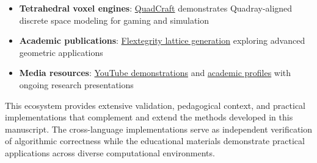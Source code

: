 \documentclass[
  10pt,
]{article}
\providecommand{\tightlist}{%
  \setlength{\itemsep}{0pt}\setlength{\parskip}{0pt}}
\begin{document}
\begin{itemize}
\tightlist
\item
  \textbf{Tetrahedral voxel engines}:
  \href{https://github.com/docxology/quadcraft/}{QuadCraft} demonstrates
  Quadray-aligned discrete space modeling for gaming and simulation
\item
  \textbf{Academic publications}:
  \href{https://www.academia.edu/44531954/Generating_the_Flextegrity_Lattice}{Flextegrity
  lattice generation} exploring advanced geometric applications
\item
  \textbf{Media resources}:
  \href{https://www.youtube.com/watch?v=g14mu4uWD4E}{YouTube
  demonstrations} and
  \href{https://princeton.academia.edu/kirbyurner}{academic profiles}
  with ongoing research presentations
\end{itemize}

This ecosystem provides extensive validation, pedagogical context, and
practical implementations that complement and extend the methods
developed in this manuscript. The cross-language implementations serve
as independent verification of algorithmic correctness while the
educational materials demonstrate practical applications across diverse
computational environments.
\end{document}
